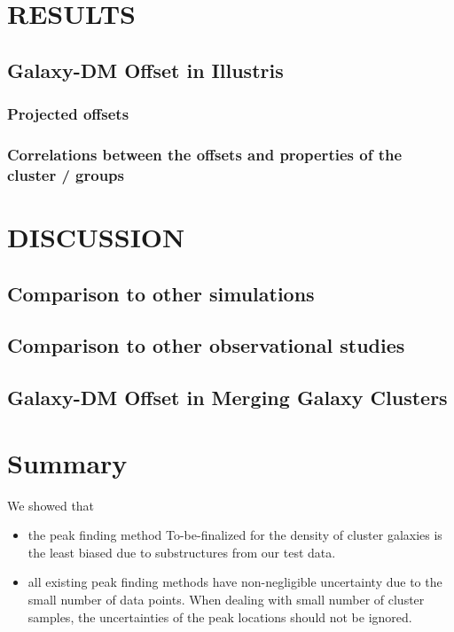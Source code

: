 \documentclass[usenatbib]{mn2e}
\begin{document}
\section{RESULTS} 

\subsection{Galaxy-DM Offset in Illustris}
\subsubsection{Projected offsets}
\subsubsection{Correlations between the offsets and properties of the cluster / groups}
\section{DISCUSSION}
\subsection{Comparison to other simulations}
\subsection{Comparison to other observational studies}
\subsection{Galaxy-DM Offset in Merging Galaxy Clusters}



\section{Summary}
We showed that 
\begin{itemize}
		\item  the peak finding method To-be-finalized for the density of cluster
			galaxies is the least biased due to substructures from our test data. 
		\item  all existing peak finding methods have non-negligible uncertainty 
			due to the small number of data points. When dealing with small number of
			cluster samples, the uncertainties of the peak locations should not be
			ignored.
\end{itemize}
\end{document}
